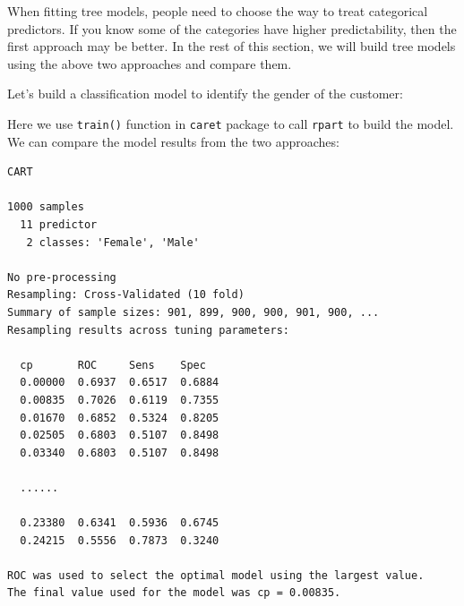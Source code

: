 \documentclass[12pt,]{krantz}
\makeatletter
\newenvironment{Shaded}{\begin{snugshade}}{\end{snugshade}}
\newcommand{\CommentTok}[1]{\textcolor[rgb]{0.37,0.37,0.37}{\textit{#1}}}
\newcommand{\DataTypeTok}[1]{\textcolor[rgb]{0.27,0.27,0.27}{#1}}
\newcommand{\KeywordTok}[1]{\textcolor[rgb]{0.27,0.27,0.27}{\textbf{#1}}}
\newcommand{\NormalTok}[1]{#1}
\newcommand{\OperatorTok}[1]{\textcolor[rgb]{0.43,0.43,0.43}{\textbf{#1}}}
\newcommand{\StringTok}[1]{\textcolor[rgb]{0.5,0.5,0.5}{#1}}
\newenvironment{kframe}{%
\medskip{}
\setlength{\fboxsep}{.8em}
 \def\at@end@of@kframe{}%
 \ifinner\ifhmode%
  \def\at@end@of@kframe{\end{minipage}}%
  \begin{minipage}{\columnwidth}%
 \fi\fi%
 \def\FrameCommand##1{\hskip\@totalleftmargin \hskip-\fboxsep
 \colorbox{shadecolor}{##1}\hskip-\fboxsep
     \hskip-\linewidth \hskip-\@totalleftmargin \hskip\columnwidth}%
 \MakeFramed {\advance\hsize-\width
   \@totalleftmargin\z@ \linewidth\hsize
   \@setminipage}}%
 {\par\unskip\endMakeFramed%
 \at@end@of@kframe}
\renewenvironment{Shaded}{\begin{kframe}}{\end{kframe}}
\makeatother
\begin{document}
When fitting tree models, people need to choose the way to treat categorical predictors. If you know some of the categories have higher predictability, then the first approach may be better. In the rest of this section, we will build tree models using the above two approaches and compare them.

Let's build a classification model to identify the gender of the customer:

\begin{Shaded}
\end{Shaded}

Here we use \texttt{train()} function in \texttt{caret} package to call \texttt{rpart} to build the model. We can compare the model results from the two approaches:

\begin{verbatim}
CART 

1000 samples
  11 predictor
   2 classes: 'Female', 'Male' 

No pre-processing
Resampling: Cross-Validated (10 fold) 
Summary of sample sizes: 901, 899, 900, 900, 901, 900, ... 
Resampling results across tuning parameters:

  cp       ROC     Sens    Spec  
  0.00000  0.6937  0.6517  0.6884
  0.00835  0.7026  0.6119  0.7355
  0.01670  0.6852  0.5324  0.8205
  0.02505  0.6803  0.5107  0.8498
  0.03340  0.6803  0.5107  0.8498
  
  ......

  0.23380  0.6341  0.5936  0.6745
  0.24215  0.5556  0.7873  0.3240

ROC was used to select the optimal model using the largest value.
The final value used for the model was cp = 0.00835.
\end{verbatim}
\end{document}
